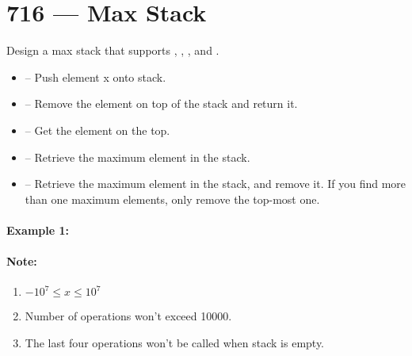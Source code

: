 \section{716 --- Max Stack}
Design a max stack that supports , , ,  and .

\begin{itemize}
\item {} -- Push element x onto stack.
\item {} -- Remove the element on top of the stack and return it.
\item {} -- Get the element on the top.
\item {} -- Retrieve the maximum element in the stack.
\item {} -- Retrieve the maximum element in the stack, and remove it. If you find more than one maximum elements, only remove the top-most one.
\end{itemize}

\paragraph{Example 1:}
\begin{flushleft}










\end{flushleft}

\paragraph{Note:}
\begin{enumerate}
\item $-10^7 \leq x \leq 10^7$
\item Number of operations won't exceed 10000.
\item The last four operations won't be called when stack is empty.
\end{enumerate}

